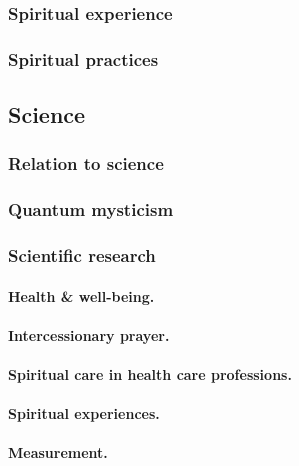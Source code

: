 \documentclass[oneside]{book}
\numberwithin{equation}{section}
\begin{document}
\subsubsection{Spiritual experience}

\subsubsection{Spiritual practices}

\subsection{Science}

\subsubsection{Relation to science}

\subsubsection{Quantum mysticism}

\subsubsection{Scientific research}

\paragraph{Health \& well-being.}

\paragraph{Intercessionary prayer.}

\paragraph{Spiritual care in health care professions.}

\paragraph{Spiritual experiences.}

\paragraph{Measurement.}




\printbibliography[heading=bibintoc]
	
\end{document}
